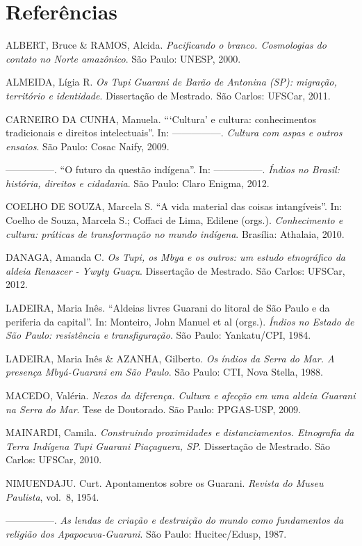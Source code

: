 \section{Referências}

ALBERT, Bruce \& RAMOS, Alcida. \emph{Pacificando o branco. Cosmologias do
contato no Norte amazônico}. São Paulo: UNESP, 2000.

ALMEIDA, Lígia R. \emph{Os Tupi Guarani de Barão de Antonina (SP): migração,
território e identidade}. Dissertação de Mestrado. São Carlos: UFSCar,
2011.

CARNEIRO DA CUNHA, Manuela. ``‘Cultura’ e cultura: conhecimentos
tradicionais e direitos intelectuais''. In: —————. \emph{Cultura com aspas e outros
ensaios}. São Paulo: Cosac Naify, 2009. 

—————. ``O futuro da questão indígena''. In: —————. \emph{Índios no Brasil: história,
direitos e cidadania}. São Paulo: Claro Enigma, 2012.

COELHO DE SOUZA, Marcela S. ``A vida material das coisas intangíveis''.
In: Coelho de Souza, Marcela S.; Coffaci de Lima, Edilene (orgs.).
\emph{Conhecimento e cultura: práticas de transformação no mundo indígena}.
Brasília: Athalaia, 2010.

DANAGA, Amanda C. \emph{Os Tupi, os Mbya e os outros: um estudo etnográfico da
aldeia Renascer - Ywyty Guaçu}. Dissertação de Mestrado. São Carlos:
UFSCar, 2012. 

LADEIRA, Maria Inês. ``Aldeias livres Guarani do litoral de São Paulo e
da periferia da capital''. In: Monteiro, John Manuel et al (orgs.).
\emph{Índios no Estado de São Paulo: resistência e transfiguração}. São Paulo:
Yankatu/CPI, 1984.

LADEIRA, Maria Inês \& AZANHA, Gilberto. \emph{Os índios da Serra do Mar. A
presença Mbyá-Guarani em São Paulo}. São Paulo: CTI, Nova Stella, 1988.

MACEDO, Valéria. \emph{Nexos da diferença. Cultura e afecção em uma aldeia
Guarani na Serra do Mar}. Tese de Doutorado.  São Paulo: PPGAS-USP,
2009.

MAINARDI, Camila. \emph{Construindo proximidades e distanciamentos. Etnografia
da Terra Indígena Tupi Guarani Piaçaguera, SP}. Dissertação de Mestrado.
São Carlos: UFSCar, 2010.

NIMUENDAJU. Curt. Apontamentos sobre os Guarani. \emph{Revista do Museu
Paulista}, vol.~8, 1954.

—————. \emph{As lendas de criação e destruição do mundo como fundamentos da
religião dos Apapocuva-Guarani}. São Paulo: Hucitec/Edusp, 1987.

